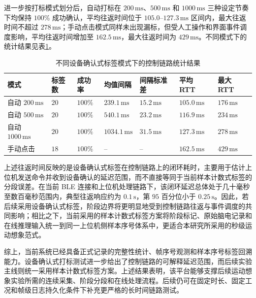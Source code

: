 进一步按打标模式划分后，自动打标在 $200\,\mathrm{ms}$、$500\,\mathrm{ms}$ 和 $1000\,\mathrm{ms}$ 三种设定节奏下均保持 $100\%$ 成功确认，平均往返时间位于 $105.0$--$127.3\,\mathrm{ms}$ 区间内，最大往返时间不超过 $278\,\mathrm{ms}$；手动点击模式同样未出现漏标，但受人工操作和界面事件调度影响，平均往返时间增加至 $162.5\,\mathrm{ms}$，最大往返时间为 $429\,\mathrm{ms}$。不同模式下的统计结果见表\ref{tab:c3_marker_modes}。

\begin{table}[htbp]
    \centering
    \caption{不同设备确认式标签模式下的控制链路统计结果}
    \label{tab:c3_marker_modes}
    \footnotesize
    \renewcommand{\arraystretch}{1.18}
    \setlength{\tabcolsep}{3.5pt}
    \begin{tabular}{p{2.0cm}p{1.0cm}p{1.2cm}p{1.8cm}p{1.8cm}p{1.8cm}p{1.6cm}}
        \toprule[1.5pt]
        模式 & 标签数 & 成功率 & 均值间隔 & 间隔标准差 & 平均 RTT & 最大 RTT \\
        \midrule[1pt]
        自动 $200\,\mathrm{ms}$ & $20$ & $100\%$ & $239.1\,\mathrm{ms}$ & $15.2\,\mathrm{ms}$ & $105.0\,\mathrm{ms}$ & $176\,\mathrm{ms}$ \\
        自动 $500\,\mathrm{ms}$ & $20$ & $100\%$ & $540.1\,\mathrm{ms}$ & $23.2\,\mathrm{ms}$ & $116.9\,\mathrm{ms}$ & $234\,\mathrm{ms}$ \\
        自动 $1000\,\mathrm{ms}$ & $20$ & $100\%$ & $1034.1\,\mathrm{ms}$ & $31.5\,\mathrm{ms}$ & $127.3\,\mathrm{ms}$ & $278\,\mathrm{ms}$ \\
        手动点击 & $18$ & $100\%$ & -- & -- & $162.5\,\mathrm{ms}$ & $429\,\mathrm{ms}$ \\
        \bottomrule[1.5pt]
    \end{tabular}
\end{table}

上述往返时间反映的是设备确认式标签在控制链路上的闭环耗时，主要用于估计上位机发送命令并收到设备确认的延迟范围，而不直接等同于当前样本计数式标签的分段误差。在当前 BLE 连接和上位机处理链路下，该闭环延迟总体处于几十毫秒至数百毫秒范围内，典型往返响应约为 $0.1\,\mathrm{s}$，第 $95$ 百分位小于 $0.25\,\mathrm{s}$。因此，若后续采用设备确认式标签，阶段边界将更明显地受到控制链路往返与事件调度的共同影响；相比之下，当前采用的样本计数式标签方案将阶段标记、原始脑电记录和在线推理输入统一到同一上位机侧样本序号体系中，更适合本研究所采用的秒级运动想象范式。

综上，当前系统已经具备正式记录的完整性统计、帧序号观测和样本序号标签回溯能力。设备确认式打标测试进一步给出了控制链路的可解释延迟范围，而后续实验主线则统一采用样本计数式标签方案。上述结果表明，该平台能够支撑后续运动想象实验所需的连续采集、阶段分段和在线处理流程。后续仍可在固定时长、固定工况和帧级日志持久化条件下补充更严格的长时间链路测试。

